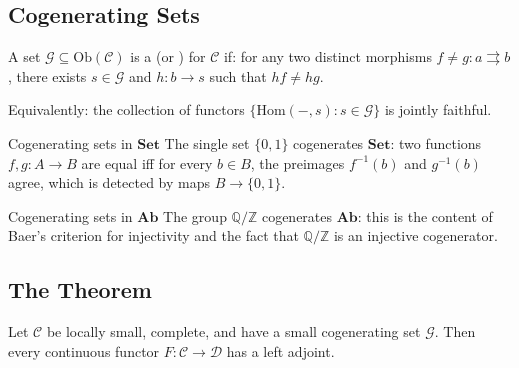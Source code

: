 \subsection{Cogenerating Sets}

\begin{definition}
A set $\mathcal{G} \subseteq \mathrm{Ob}(\mathcal{C})$ is a
 (or ) for $\mathcal{C}$ if:
for any two distinct morphisms $f \neq g : a \rightrightarrows b$,
there exists $s \in \mathcal{G}$ and $h : b \to s$ such that $hf \neq hg$.

Equivalently: the collection of functors $\{\mathrm{Hom}(-,s) : s \in
\mathcal{G}\}$ is jointly faithful.
\end{definition}

\begin{example}{Cogenerating sets in $\mathbf{Set}$}
The single set $\{0,1\}$ cogenerates $\mathbf{Set}$: two functions $f,g:
A \to B$ are equal iff for every $b \in B$, the preimages $f^{-1}(b)$
and $g^{-1}(b)$ agree, which is detected by maps $B \to \{0,1\}$.
\end{example}

\begin{example}{Cogenerating sets in $\mathbf{Ab}$}
The group $\mathbb{Q}/\mathbb{Z}$ cogenerates $\mathbf{Ab}$: this is
the content of Baer's criterion for injectivity and the fact that
$\mathbb{Q}/\mathbb{Z}$ is an injective cogenerator.
\end{example}

\subsection{The Theorem}

\begin{theorem}
\label{thm:saft}
Let $\mathcal{C}$ be locally small, complete, and have a small
cogenerating set $\mathcal{G}$. Then every continuous functor
$F : \mathcal{C} \to \mathcal{D}$ has a left adjoint.
\end{theorem}

